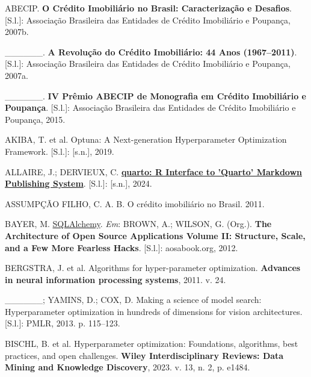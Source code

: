 \documentclass[
  12pt,
  a4paper,
]{scrreprt}
\newlength{\cslhangindent}
\newenvironment{CSLReferences}[2] %
 {\begin{list}{}{%
  \setlength{\itemindent}{0pt}
  \setlength{\leftmargin}{0pt}
  \setlength{\parsep}{0pt}
  \ifodd #1
   \setlength{\leftmargin}{\cslhangindent}
   \setlength{\itemindent}{-1\cslhangindent}
  \fi
  \setlength{\itemsep}{#2\baselineskip}}}
 {\end{list}}
\begin{document}
\label{refs}
\begin{CSLReferences}{0}{1}
ABECIP. \textbf{O Crédito Imobiliário no Brasil: Caracterização e
Desafios}. {[}S.l.{]}: Associação Brasileira das Entidades de Crédito
Imobiliário e Poupança, 2007b.

\_\_\_\_\_\_. \textbf{A Revolução do Crédito Imobiliário: 44 Anos
(1967--2011)}. {[}S.l.{]}: Associação Brasileira das Entidades de
Crédito Imobiliário e Poupança, 2007a.

\_\_\_\_\_\_. \textbf{IV Prêmio ABECIP de Monografia em Crédito
Imobiliário e Poupança}. {[}S.l.{]}: Associação Brasileira das Entidades
de Crédito Imobiliário e Poupança, 2015.

AKIBA, T. et al. Optuna: A Next-generation Hyperparameter Optimization
Framework. {[}S.l.{]}: {[}s.n.{]}, 2019.

ALLAIRE, J.; DERVIEUX, C.
\textbf{\href{https://CRAN.R-project.org/package=quarto}{quarto: R
Interface to 'Quarto' Markdown Publishing System}}. {[}S.l.{]}:
{[}s.n.{]}, 2024.

ASSUMPÇÃO FILHO, C. A. B. O cr{é}dito imobili{á}rio no Brasil. 2011.

BAYER, M. \href{http://aosabook.org/en/sqlalchemy.html}{SQLAlchemy}.
\emph{Em}: BROWN, A.; WILSON, G. (Org.). \textbf{The Architecture of
Open Source Applications Volume II: Structure, Scale, and a Few More
Fearless Hacks}. {[}S.l.{]}: aosabook.org, 2012.

BERGSTRA, J. et al. Algorithms for hyper-parameter optimization.
\textbf{Advances in neural information processing systems}, 2011. v. 24.

\_\_\_\_\_\_; YAMINS, D.; COX, D. Making a science of model search:
Hyperparameter optimization in hundreds of dimensions for vision
architectures. {[}S.l.{]}: PMLR, 2013. p. 115--123.

BISCHL, B. et al. Hyperparameter optimization: Foundations, algorithms,
best practices, and open challenges. \textbf{Wiley Interdisciplinary
Reviews: Data Mining and Knowledge Discovery}, 2023. v. 13, n. 2, p.
e1484.


\end{CSLReferences}
\end{document}
